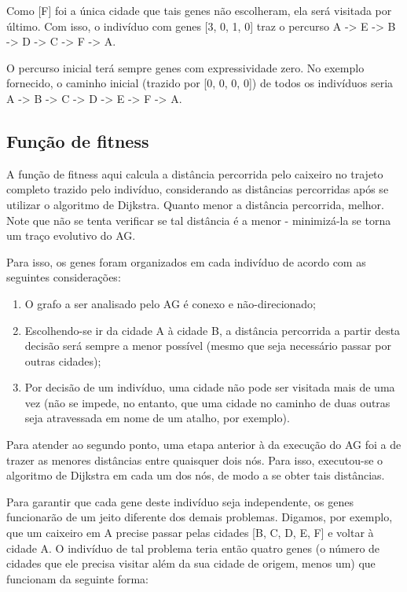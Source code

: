 Como [F] foi a única cidade que tais genes não escolheram, ela será visitada por último. Com isso, o indivíduo com genes [3, 0, 1, 0] traz o percurso A -> E -> B -> D -> C -> F -> A.

O percurso inicial terá sempre genes com expressividade zero. No exemplo fornecido, o caminho inicial (trazido por [0, 0, 0, 0]) de todos os indivíduos seria A -> B -> C -> D -> E -> F -> A.

\subsection*{Função de fitness}

A função de fitness aqui calcula a distância percorrida pelo caixeiro no trajeto completo trazido pelo indivíduo, considerando as distâncias percorridas após se utilizar o algoritmo de Dijkstra. Quanto menor a distância percorrida, melhor. Note que não se tenta verificar se tal distância é a menor - minimizá-la se torna um traço evolutivo do AG.

Para isso, os genes foram organizados em cada indivíduo de acordo com as seguintes considerações:

\begin{enumerate}[label={(\arabic*)}]
	\item O grafo a ser analisado pelo AG é conexo e não-direcionado;
	\item Escolhendo-se ir da cidade A à cidade B, a distância percorrida a partir desta decisão será sempre a menor possível (mesmo que seja necessário passar por outras cidades);
	\item Por decisão de um indivíduo, uma cidade não pode ser visitada mais de uma vez (não se impede, no entanto, que uma cidade no caminho de duas outras seja atravessada em nome de um atalho, por exemplo).
\end{enumerate}

Para atender ao segundo ponto, uma etapa anterior à da execução do AG foi a de trazer as menores distâncias entre quaisquer dois nós. Para isso, executou-se o algoritmo de Dijkstra \cite{dijkstra1959note} em cada um dos nós, de modo a se obter tais distâncias.

Para garantir que cada gene deste indivíduo seja independente, os genes funcionarão de um jeito diferente dos demais problemas. Digamos, por exemplo, que um caixeiro em A precise passar pelas cidades [B, C, D, E, F] e voltar à cidade A. O indivíduo de tal problema teria então quatro genes (o número de cidades que ele precisa visitar além da sua cidade de origem, menos um) que funcionam da seguinte forma:


